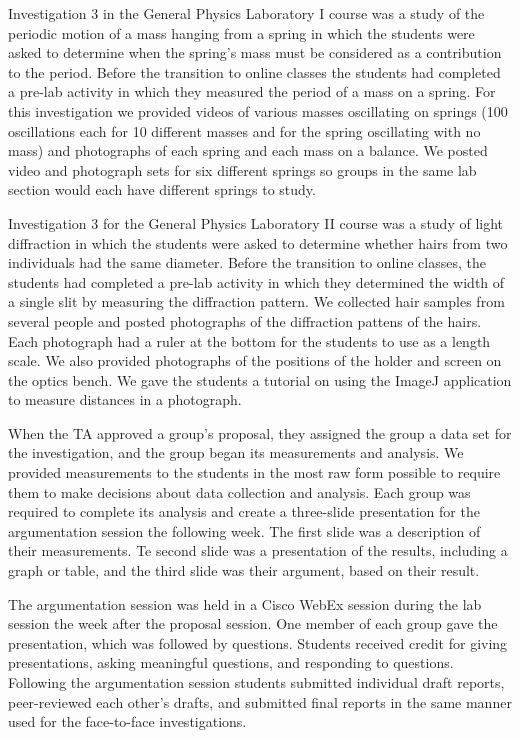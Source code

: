 \documentclass[aip, numerical, preprint]{revtex4-2}
\begin{document}
Investigation 3 in the General Physics Laboratory I course was a study of the periodic motion
of a mass hanging from a spring in which the students were asked to determine when the spring's
mass must be considered as a contribution to the period. Before the transition to online
classes the students had completed a pre-lab activity in which they measured the period of a
mass on a spring. For this investigation we provided videos of various masses oscillating on
springs (100 oscillations each for 10 different masses and for the spring oscillating with no
mass) and photographs of each spring and each mass on a balance. We posted video and photograph
sets for six different springs so groups in the same lab section would each have different
springs to study.

Investigation 3 for the General Physics Laboratory II course was a study of light diffraction
in which the students were asked to determine whether hairs from two individuals had the same
diameter. Before the transition to online classes, the students had completed a pre-lab
activity in which they determined the width of a single slit by measuring the diffraction
pattern. We collected hair samples from several people and posted photographs of the
diffraction pattens of the hairs. Each photograph had a ruler at the bottom for the students to
use as a length scale. We also provided photographs of the positions of the holder and screen
on the optics bench. We gave the students a tutorial on using the ImageJ
application\citep{schrasetal12} to measure distances in a photograph.

When the TA approved a group's proposal, they assigned the group a data set for the
investigation, and the group began its measurements and analysis. We provided measurements to
the students in the most raw form possible to require them to make decisions about data
collection and analysis. Each group was required to complete its analysis and create a
three-slide presentation for the argumentation session the following week. The first slide was
a description of their measurements. Te second slide was a presentation of the results,
including a graph or table, and the third slide was their argument, based on their result.

The argumentation session was held in a Cisco WebEx session during the lab session the week
after the proposal session. One member of each group gave the presentation, which was followed
by questions. Students received credit for giving presentations, asking meaningful questions,
and responding to questions.  Following the argumentation session students submitted individual
draft reports, peer-reviewed each other's drafts, and submitted final reports in the same
manner used for the face-to-face investigations.
\end{document}
